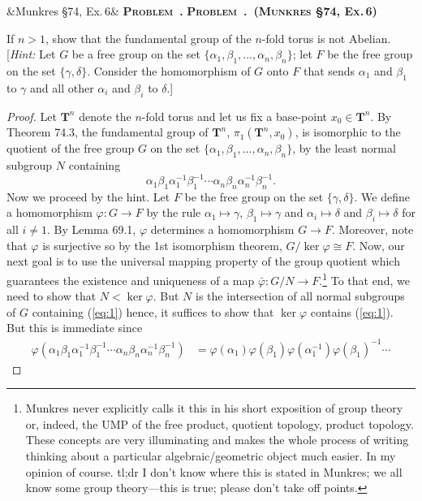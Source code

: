 \documentclass[article,oneside,10pt]{memoir}
\theoremstyle{plain}
\theoremstyle{definition}
\newcounter{problem}
\newenvironment{problem}[1][]%
{%
  \stepcounter{problem}
  \par\vspace{\baselineskip}\noindent
  \ifx &#1&%
  {\normalfont\Large\bfseries\scshape Problem~\hwnum.\theproblem}
  \global\def\exercisename{Problem~\hwnum.\theproblem}%
  \else
  {\normalfont\Large\bfseries\scshape Problem~\hwnum.\theproblem~(#1)}
  \global\def\exercisename{Problem~\hwnum.\theproblem(#1)}
  \fi
  \par\vspace{\baselineskip}%
  \noindent\ignorespaces
}%
{%
  \par\vspace{\baselineskip}%
  \noindent\ignorespacesafterend
}
\theoremstyle{remark}
\newcommand{\bfT}{\mathbf{T}}
\begin{document}
\begin{problem}[Munkres \S74, Ex.\,6]
If $n>1$, show that the fundamental group of the $n$-fold torus is not
Abelian. [\emph{Hint:} Let $G$ be a free group on the set
$\{\alpha_1,\beta_1,...,\alpha_n,\beta_n\}$; let $F$ be the free group on
the set $\{\gamma,\delta\}$. Consider the homomorphism of $G$ onto $F$ that
sends $\alpha_1$ and $\beta_1$ to $\gamma$ and all other $\alpha_i$ and
$\beta_i$ to $\delta$.]
\end{problem}
\begin{proof}
Let $\bfT^n$ denote the $n$-fold torus and let us fix a base-point
$x_0\in\bfT^n$. By Theorem 74.3, the fundamental group of $\bfT^n$,
$\pi_1(\bfT^n,x_0)$, is isomorphic to the quotient of the free group $G$ on
the set $\{\alpha_1,\beta_1,...,\alpha_n,\beta_n\}$, by the least normal
subgroup $N$ containing
\begin{equation}
\label{eq:1}
\alpha_1\beta_1\alpha_1^{-1}\beta_1^{-1}
\cdots
\alpha_n\beta_n\alpha_n^{-1}\beta_n^{-1}.
\end{equation}
Now we proceed by the hint. Let $F$ be the free group on the set
$\{\gamma,\delta\}$. We define a homomorphism $\varphi\colon G\to F$ by the
rule $\alpha_1\mapsto\gamma$, $\beta_1\mapsto\gamma$ and
$\alpha_i\mapsto\delta$ and $\beta_i\mapsto\delta$ for all $i\neq
1$. By Lemma 69.1, $\varphi$ determines a homomorphism $G\to F$. Moreover,
note that $\varphi$ is surjective so by the 1st isomorphism theorem,
$G/\ker\varphi\cong F$. Now, our next goal is to use the universal mapping
property of the group quotient which guarantees the existence and
uniqueness of a map $\bar\varphi\colon G/N\to F$.\footnote{Munkres never
explicitly calls it this in his short exposition of group theory or,
indeed, the UMP of the free product, quotient topology, product
topology. These concepts are very illuminating and makes the whole process
of writing thinking about a particular algebraic/geometric object much
easier. In my opinion of course. tl;dr I don't know where this is stated in
Munkres; we all know some group theory---this is true; please don't take
off points.} To that end, we need to show that $N<\ker\varphi$. But $N$ is
the intersection of all normal subgroups of $G$ containing (\ref{eq:1})
hence, it suffices to show that $\ker\varphi$ contains (\ref{eq:1}). But
this is immediate since
\begin{align*}
\varphi(
\alpha_1\beta_1\alpha_1^{-1}\beta_1^{-1}
\cdots
\alpha_n\beta_n\alpha_n^{-1}\beta_n^{-1})
&=\varphi(\alpha_1)\varphi(\beta_1)\varphi(\alpha_1^{-1})\varphi(\beta_1)^{-1}\cdots

\end{align*}
\end{proof}
\end{document}
